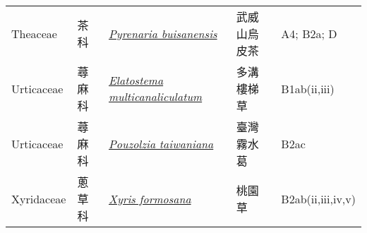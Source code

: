 {\begin{longtable}{L{2.5cm}L{2cm}L{5cm}L{2.5cm}L{3cm}}
    Theaceae & 茶科 & \href{http://www.theplantlist.org/tpl1.1/search?q=Pyrenaria+buisanensis}{\textit{Pyrenaria buisanensis} } & 武威山烏皮茶 & A4; B2a; D    \\
    Urticaceae & 蕁麻科 & \href{http://www.theplantlist.org/tpl1.1/search?q=Elatostema+multicanaliculatum}{\textit{Elatostema multicanaliculatum} } & 多溝樓梯草 & B1ab(ii,iii)    \\
    Urticaceae & 蕁麻科 & \href{http://www.theplantlist.org/tpl1.1/search?q=Pouzolzia+taiwaniana}{\textit{Pouzolzia taiwaniana} } & 臺灣霧水葛 & B2ac    \\
    Xyridaceae & 蔥草科 & \href{http://www.theplantlist.org/tpl1.1/search?q=Xyris+formosana}{\textit{Xyris formosana} } & 桃園草 & B2ab(ii,iii,iv,v)    \\
    \bottomrule
        \end{longtable}
        }
    